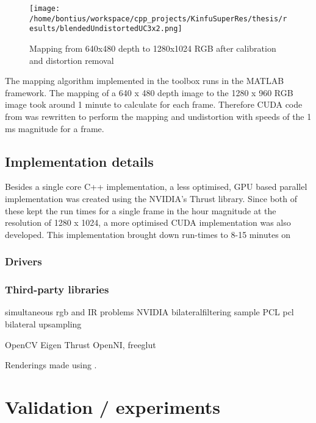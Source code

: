 \documentclass{ucl_thesis}
\begin{document}
\begin{figure}[h!]\centering
        \texttt{[image: /home/bontius/workspace/cpp\_projects/KinfuSuperRes/thesis/results/blendedUndistortedUC3x2.png]}
        \caption{Mapping from 640x480 depth to 1280x1024 RGB after calibration and distortion removal}
        \label{fig:final_calib}
\end{figure}

\par The mapping algorithm implemented in the toolbox runs in the MATLAB framework. The mapping of a 640 x 480 depth image to the 1280 x 960 RGB image took around 1 minute to calculate for each frame. Therefore CUDA code from \citep{kinect_lua} was rewritten to perform the mapping and undistortion with speeds of the 1 ms magnitude for a frame.

\section{Implementation details}
\label{sec:implementation_details}

\par Besides a single core C++ implementation, a less optimised, GPU based parallel implementation was created using the NVIDIA's Thrust library. Since both of these kept the run times for a single frame in the hour magnitude at the resolution of 1280 x 1024, a more optimised CUDA implementation was also developed. This implementation brought down run-times to 8-15 minutes on 

\subsection{Drivers}
\subsection{Third-party libraries}
simultaneous rgb and IR problems
NVIDIA bilateralfiltering sample
PCL
 pcl bilateral upsampling
 \citep{DCBGridStereo}
 
 OpenCV
 Eigen
 Thrust
 OpenNI, freeglut
 
Renderings made using \citep{Meshlab}.

\chapter{Validation / experiments}
\label{chp:validation}
\end{document}
